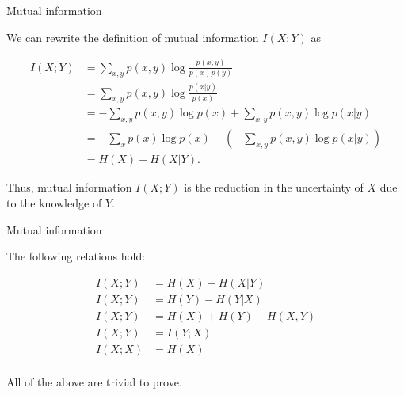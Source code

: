 \begin{vbframe} {Mutual information}

We can rewrite the definition of mutual information $I(X;Y)$ as

\begin{equation*}\begin{aligned}
I(X ; Y) &=\sum_{x, y} p(x, y) \log \frac{p(x, y)}{p(x) p(y)} \\
&=\sum_{x, y} p(x, y) \log \frac{p(x | y)}{p(x)} \\
&=-\sum_{x, y} p(x, y) \log p(x)+\sum_{x, y} p(x, y) \log p(x | y) \\
&=-\sum_{x} p(x) \log p(x)-\left(-\sum_{x, y} p(x, y) \log p(x | y)\right) \\
&=H(X)-H(X | Y).
\end{aligned}\end{equation*}

Thus, mutual information $I(X;Y)$ is the reduction in the uncertainty
of $X$ due to the knowledge of $Y$.

\end{vbframe}

\begin{vbframe} {Mutual information}

The following relations hold:

\begin{equation*}
\begin{aligned}
I(X ; Y) &= H(X) - H(X | Y) \\
I(X ; Y) &= H(Y) - H(Y | X) \\
I(X ; Y) &= H(X) + H(Y) - H(X, Y) \\
I(X ; Y) &= I(Y ; X) \\
I(X ; X) &= H(X)\\
\end{aligned}
\end{equation*}

All of the above are trivial to prove.


\end{vbframe}


